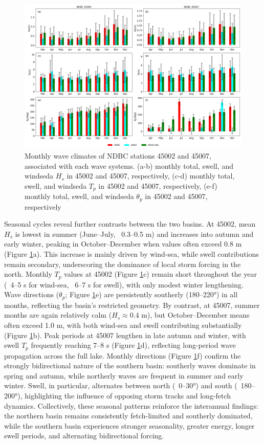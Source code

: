 \begin{figure}[htbp]
  \centering
  \includegraphics[width=1\textwidth]{chapter4/resources/ndbc_month.png}
  \caption{Monthly wave climates of NDBC stations 45002 and 45007, associated
  with each wave systems. (a-b) monthly total, swell, and windseda $H_s$ in 45002
  and 45007, respectively, (c-d) monthly total, swell, and windseda $T_p$ in
  45002 and 45007, respectively, (e-f) monthly total, swell, and windseda
  $\theta_p$ in 45002 and 45007, respectively }
  \label{fig:ndbc_month}
\end{figure}

Seasonal cycles reveal further contrasts between the two basins. At 45002, mean
$H_s$ is lowest in summer (June–July, ~0.3–0.5 m) and increases into autumn and
early winter, peaking in October–December when values often exceed 0.8 m (Figure
\ref{fig:ndbc_month}a). This increase is mainly driven by wind-sea, while swell
contributions remain secondary, underscoring the dominance of local storm
forcing in the north. Monthly $T_p$ values at 45002 (Figure
\ref{fig:ndbc_month}c) remain short throughout the year (~4–5 s for wind-sea,
~6–7 s for swell), with only modest winter lengthening. Wave directions
($\theta_p$; Figure \ref{fig:ndbc_month}e) are persistently southerly (180–220°)
in all months, reflecting the basin’s restricted geometry. By contrast, at
45007, summer months are again relatively calm ($H_s \approx 0.4$ m), but
October–December means often exceed 1.0 m, with both wind-sea and swell
contributing substantially (Figure \ref{fig:ndbc_month}b). Peak periods at 45007
lengthen in late autumn and winter, with swell $T_p$ frequently reaching 7–8 s
(Figure \ref{fig:ndbc_month}d), reflecting long-period wave propagation across
the full lake. Monthly directions (Figure \ref{fig:ndbc_month}f) confirm the
strongly bidirectional nature of the southern basin: southerly waves dominate in
spring and autumn, while northerly waves are frequent in summer and early
winter. Swell, in particular, alternates between north (~0–30°) and south
(~180–200°), highlighting the influence of opposing storm tracks and long-fetch
dynamics. Collectively, these seasonal patterns reinforce the interannual
findings: the northern basin remains consistently fetch-limited and southerly
dominated, while the southern basin experiences stronger seasonality, greater
energy, longer swell periods, and alternating bidirectional forcing.

